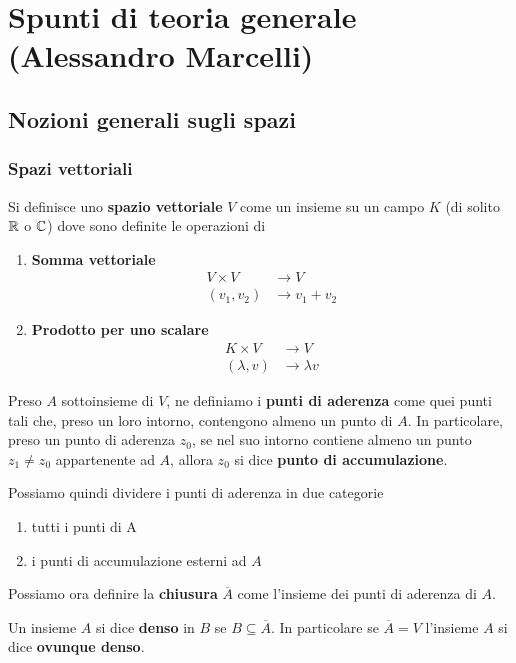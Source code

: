 \section{Spunti di teoria generale (Alessandro Marcelli)}

\subsection{Nozioni generali sugli spazi}

\subsubsection{Spazi vettoriali}

Si definisce uno \textbf{spazio vettoriale} $V$ come un insieme su un campo $K$ (di solito $\mathbb{R}$ o $\mathbb{C}$) dove sono definite le operazioni di
\begin{enumerate}
	\item \textbf{Somma vettoriale}
	\begin{align}
		V \times V &\rightarrow V\\
		(v_1,v_2)&\rightarrow v_1 + v_2
	\end{align}
	\item \textbf{Prodotto per uno scalare}
	\begin{align}
		K \times V &\rightarrow V\\
		(\lambda,v)&\rightarrow \lambda v
	\end{align}
\end{enumerate}

Preso $A$ sottoinsieme di $V$, ne definiamo i \textbf{punti di aderenza} come quei punti tali che, preso un loro intorno, contengono almeno un punto di $A$. \newline
In particolare, preso un punto di aderenza $z_0$, se nel suo intorno contiene almeno un punto $z_1 \neq z_0$ appartenente ad $A$, allora $z_0$ si dice \textbf{punto di accumulazione}.

Possiamo quindi dividere i punti di aderenza in due categorie
\begin{enumerate}
	\item tutti i punti di A
	\item  i punti di accumulazione esterni ad $A$
\end{enumerate}

Possiamo ora definire la \textbf{chiusura} $\overline{A}$ come l'insieme dei punti di aderenza di $A$. 

Un insieme $A$ si dice \textbf{denso} in $B$ se $B \subseteq \overline{A}$. In particolare se $\overline{A} = V$ l'insieme $A$ si dice \textbf{ovunque denso}.



